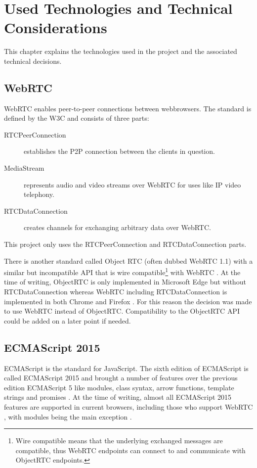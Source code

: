 \chapter{Used Technologies and Technical Considerations}

This chapter explains the technologies used in the project and the associated
technical decisions.

\section{WebRTC}

\Gls{WebRTC} enables \gls{peer-to-peer} connections between webbrowsers. The
standard is defined by the \gls{W3C} \cite{w3c2016webrtc} and consists of three
parts:

\begin{description}
\item[RTCPeerConnection] establishes the \gls{P2P} connection between the
clients in question.
\item[MediaStream] represents audio and video streams over \gls{WebRTC} for
uses like IP video telephony.
\item[RTCDataConnection] creates channels for exchanging arbitrary data over
\gls{WebRTC}.
\end{description}

This project only uses the RTCPeerConnection and RTCDataConnection parts.

There is another standard called Object RTC (often dubbed \gls{WebRTC} 1.1)
with a similar but incompatible \gls{API} that is wire compatible\footnote{Wire
compatible means that the underlying exchanged messages are compatible, thus
\gls{WebRTC} endpoints can connect to and communicate with ObjectRTC endpoints.}
with \gls{WebRTC} \cite{objectrtc2016ortc}. At the time of writing, ObjectRTC is
only implemented in Microsoft Edge \cite{Microsoft2016objectrtc} but without
RTCDataConnection \cite{Microsoft2016datachannels} whereas \gls{WebRTC}
including RTCDataConnection is implemented in both Chrome and Firefox
\cite{Microsoft2016webrtc}. For this reason the decision was made to use
\gls{WebRTC} instead of ObjectRTC. Compatibility to the ObjectRTC \gls{API}
could be added on a later point if needed.

\section{ECMAScript 2015}

\Gls{ECMAScript} is the standard for JavaScript. The sixth edition of
\gls{ECMAScript} is called \gls{ECMAScript 2015} and brought a number of
features over the previous edition \gls{ECMAScript} 5 like modules, class
syntax, arrow functions, template strings and promises
\cite{ecma2015ecmascript}. At the time of writing, almost all \gls{ECMAScript
2015} features are supported in current browsers, including those who support
\gls{WebRTC} \cite{zaytsev2016ecmascript}, with modules being the main exception
\cite{Microsoft2016modules}.

